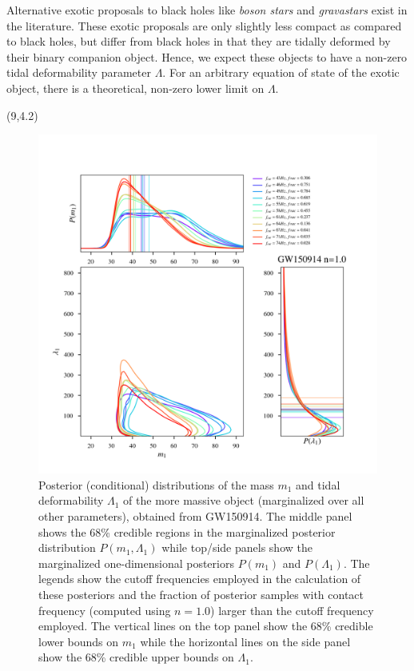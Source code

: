 \documentclass[a1,portrait]{a1poster}
\newcommand{\headingcolor}{\color{BannerElevenColor}}
\def\LHead#1{\noindent{\LARGE \headingcolor #1}\smallskip}
\begin{document}
\begin{textblock}{7}
Alternative exotic proposals to black holes like \textit{boson stars} and \textit{gravastars} exist in the literature. These exotic proposals are only slightly less compact as compared to black holes, but differ from black holes in that they are tidally deformed by their binary companion object. Hence, we expect these objects to have a non-zero tidal deformability parameter $ \Lambda $. For an arbitrary equation of state of the exotic object, there is a theoretical, non-zero lower limit on $ \Lambda $.

\end{textblock}

\begin{textblock}{7}(9,4.2)	%
\vspace{0.5cm}
\begin{figure}[t]
	\centering
	\includegraphics[scale=1.4]{GW150914.png}
	\caption{\small{Posterior (conditional) distributions of the mass $m_1$ and tidal deformability $\Lambda_1$ of the more massive object (marginalized over all other parameters), obtained from GW150914. The middle panel shows the 68\% credible regions in the marginalized posterior distribution $P (m_1, \Lambda_1)$ while top/side panels show the marginalized one-dimensional posteriors $P(m_1)$ and $P(\Lambda_1)$. The legends show the cutoff frequencies employed in the calculation of these posteriors and the fraction of posterior samples with contact frequency (computed using $n = 1.0$) larger than the cutoff frequency employed. The vertical lines on the top panel show the 68\% credible lower bounds on $m_1$ while the horizontal lines on the side panel show the 68\% credible upper bounds on $\Lambda_1$.}}
	\label{fig:hybridTD_l2m2}
\end{figure}
\LHead{Method and Results}


\end{textblock}
\end{document}
